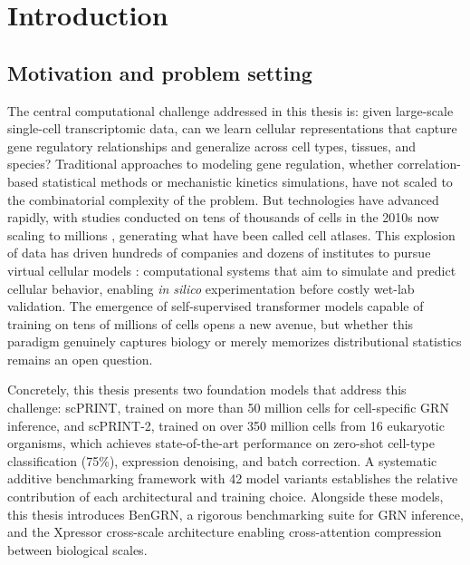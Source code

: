 \raggedbottom %

\chapter{Introduction} %
\label{chap:introduction}

\section{Motivation and problem setting}

The central computational challenge addressed in this thesis is: given large-scale single-cell
transcriptomic data, can we learn cellular representations that capture gene regulatory
relationships and generalize across cell types, tissues, and species? Traditional approaches to
modeling gene regulation, whether correlation-based statistical methods or mechanistic kinetics
simulations, have not scaled to the combinatorial complexity of the problem. But technologies have advanced rapidly, with studies conducted on tens of thousands of cells in the 2010s now scaling to millions
\cite{regevHumanCellAtlas}, generating what have been called cell atlases. This explosion of data
has driven hundreds of companies and dozens of institutes to pursue virtual cellular models
\cite{bunneHowBuildVirtual2024}: computational systems that aim to simulate and predict cellular
behavior, enabling \textit{in silico} experimentation before costly wet-lab validation. The emergence of
self-supervised transformer models capable of training on tens of millions of cells opens a new
avenue, but whether this paradigm genuinely captures biology or merely memorizes distributional
statistics remains an open question.

Concretely, this thesis presents two foundation models that address this challenge: \gls{scPRINT},
trained on more than 50 million cells for cell-specific \gls{GRN} inference, and \gls{scPRINT}-2,
trained on over 350 million cells from 16 eukaryotic organisms, which achieves state-of-the-art
performance on zero-shot cell-type classification (75\%), expression denoising, and batch correction.
A systematic additive benchmarking framework with 42 model variants establishes the relative
contribution of each architectural and training choice. Alongside these models, this thesis
introduces BenGRN, a rigorous benchmarking suite for \gls{GRN} inference, and the Xpressor
cross-scale architecture enabling cross-attention compression between biological scales.

